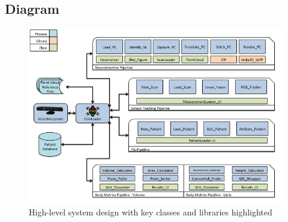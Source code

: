 
\subsection{Diagram}

\begin{figure}
    \includegraphics[scale=0.7]{images/Slide1.png}
    \caption{High-level system design with key classes and libraries highlighted}
    \label{fig:sysframework}
\end{figure}
